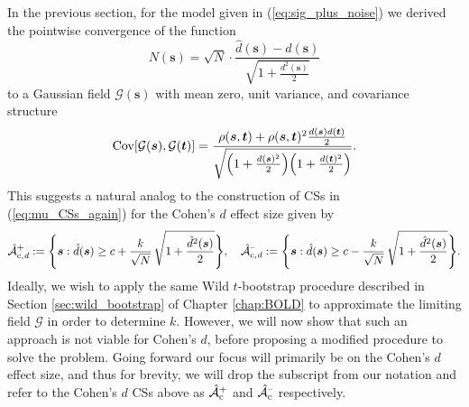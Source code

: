 In the previous section, for the model given in (\ref{eq:sig_plus_noise}) we derived the pointwise convergence of the function
\begin{equation}
\label{eq:Cohens_d_normalised error_field}
N(\bm{s}) = \sqrt{N} \cdot \frac{\hat{d}(\bm{s}) - d(\bm{s})}{\sqrt{1 + \frac{d^{2}({\bm{s}})}{2}}}
\end{equation}
to a Gaussian field $\mathcal{G}(\bm{s})$ with mean zero, unit variance, and covariance structure
\begin{equation}
\label{eq:limiting_covariance_structure}
\operatorname{\mathrm{Cov}}[\mathcal{G}(\bm{s}),\mathcal{G}(\bm{t})] = \frac{\rho(\bm{s},\bm{t}) + \rho(\bm{s},\bm{t})^{2}\frac{d({\bm{s}})d({\bm{t}})}{2}}{\sqrt{\Big(1 + \frac{d({\bm{s}})^{2}}{2}\Big)\Big(1 + \frac{d({\bm{t}})^{2}}{2}\Big)}}.
\end{equation}
This suggests a natural analog to the construction of CSs in (\ref{eq:mu_CSs_again}) for the Cohen's $d$ effect size given by
\begin{equation}
\label{eq:cohens_CSs}
\operatorname{\hat{\mathcal{A}}_{c,\textit{d}}^+} := \Bigg\{\bm{s} : \hat{d}(\bm{s}) \geq c + \frac{k}{{\sqrt{N}}}\, \sqrt{1 + \frac{\hat{d}^{2}({\bm{s}})}{2}}\Bigg\}, \quad \operatorname{\hat{\mathcal{A}}_{c,\textit{d}}^{\textrm{--}}} := \Bigg\{\bm{s} : \hat{d}(\bm{s}) \geq c - \frac{k}{{\sqrt{N}}} \,\sqrt{1 + \frac{\hat{d}^{2}({\bm{s}})}{2}}  \Bigg\}.
\end{equation}
Ideally, we wish to apply the same Wild $t$-bootstrap procedure described in Section \ref{sec:wild_bootstrap} of Chapter \ref{chap:BOLD} to approximate the limiting field $\mathcal{G}$ in order to determine $k$. However, we will now show that such an approach is not viable for Cohen's $d$, before proposing a modified procedure to solve the problem. Going forward our focus will primarily be on the Cohen's $d$ effect size, and thus for brevity, we will drop the subscript from our notation and refer to the Cohen's $d$ CSs above as $\operatorname{\hat{\mathcal{A}}_{c}^+}$ and $\operatorname{\hat{\mathcal{A}}_{c}^{\textrm{--}}}$ respectively.


